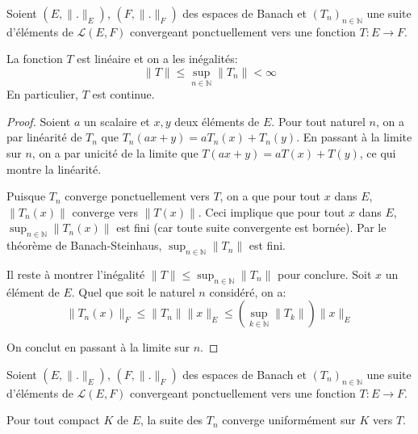 \begin{cor}
  Soient $(E, \|.\|_E)$, $(F, \|.\|_F)$ des espaces de Banach et
  $(T_n)_{n\in\mathbb N}$ une suite d'éléments de $\mathscr{L}(E, F)$
  convergeant ponctuellement vers une fonction $T: E\to F$.

  La fonction $T$ est linéaire et on a les inégalités:
  $$\|T\| \leq \sup_{n\in\mathbb N}\|T_n\| < \infty$$
  En particulier, $T$ est continue.
\end{cor}

\begin{proof}
  Soient $a$ un scalaire et $x, y$ deux éléments de $E$. Pour tout
  naturel $n$, on a par linéarité de $T_n$ que
  $T_n(ax + y) = a T_n(x) + T_n(y)$. En passant à la limite sur $n$,
  on a par unicité de la limite que $T(ax + y) = aT(x) + T(y)$, ce qui
  montre la linéarité.

  Puisque $T_n$ converge ponctuellement vers $T$, on a que pour
  tout $x$ dans $E$, $\|T_n(x)\|$ converge vers $\|T(x)\|$. Ceci
  implique que pour tout $x$ dans $E$, $\sup_{n\in\mathbb N} \|T_n(x)\|$
  est fini (car toute suite convergente est bornée). Par le
  théorème de Banach-Steinhaus, $\sup_{n\in\mathbb N}\|T_n\|$ est fini.

  Il reste à montrer l'inégalité $\|T\|\leq \sup_{n\in\mathbb N}\|T_n\|$
  pour conclure. Soit $x$ un élément de $E$. Quel que soit le naturel
  $n$ considéré, on a:
  $$\|T_n(x)\|_F\leq \|T_n\|\|x\|_E\leq
  \left(\sup_{k\in\mathbb N}\|T_k\|\right)\|x\|_E$$

  On conclut en passant à la limite sur $n$.
\end{proof}

\begin{prop}
  Soient $(E, \|.\|_E)$, $(F, \|.\|_F)$ des espaces de Banach et
  $(T_n)_{n\in\mathbb N}$ une suite d'éléments de $\mathscr{L}(E, F)$
  convergeant ponctuellement vers une fonction $T: E\to F$.

  Pour tout compact $K$ de $E$, la suite des $T_n$ converge
  uniformément sur $K$ vers $T$.
\end{prop}

